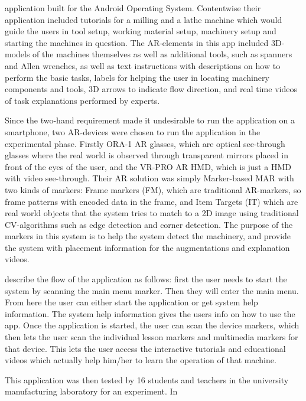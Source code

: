 application built for the Android Operating System. Contentwise their 
application included tutorials for a milling and a lathe machine which would 
guide the users in tool setup, working material setup, machinery setup and 
starting the machines in question.\cite{reyesEtAl2016} The AR-elements in this 
app included 3D-models of the machines themselves as well as additional 
tools, such as spanners and Allen wrenches, as well as text instructions with 
descriptions on how to perform the basic tasks, labels for helping the user 
in locating machinery components and tools, 3D arrows to indicate flow 
direction, and real time videos of task explanations performed by 
experts.\cite{reyesEtAl2016}\par
	Since the two-hand requirement made it undesirable to run the 
application on a smartphone, two AR-devices were chosen to run the 
application in the experimental phase. Firstly ORA-1 AR glasses, which are 
optical see-through glasses where the real world is observed through 
transparent mirrors placed in front of the eyes of the user, and the VR-PRO 
AR HMD, which is just a HMD with video see-through.\cite{reyesEtAl2016} Their 
AR solution was simply Marker-based MAR with two kinds of markers: Frame 
markers (FM), which are traditional AR-markers, so frame patterns with encoded 
data in the frame, and Item Targets (IT) which are real world objects that 
the system tries to match to a 2D image using traditional CV-algorithms such 
as edge detection and corner detection.\cite{reyesEtAl2016} The purpose of the 
markers in this system is to help the system detect the machinery, and 
provide the system with placement information for the augmentations and 
explanation videos.\cite{reyesEtAl2016}\par
	\textcite{reyesEtAl2016} describe the flow of the application as 
follows: first the user needs to start the system by scanning the main menu 
marker. Then they will enter the main menu. From here the user can either 
start the application or get system help information. The system help 
information gives the users info on how to use the app. Once the application 
is started, the user can scan the device markers, which then lets the user 
scan the individual lesson markers and multimedia markers for that device. 
This lets the user access the interactive tutorials and educational videos 
which actually help him/her to learn the operation of that 
machine.\cite{reyesEtAl2016}\par
	This application was then tested by 16 students and teachers in the 
university manufacturing laboratory for an experiment.\cite{reyesEtAl2016} In 
